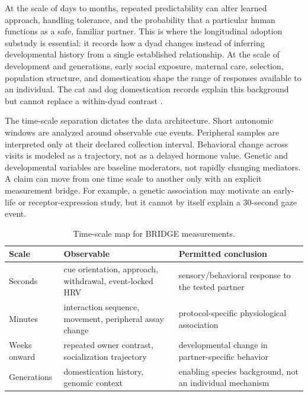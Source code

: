\documentclass[conference]{IEEEtran}
\begin{document}
At the scale of days to months, repeated predictability can alter learned approach, handling tolerance, and the probability that a particular human functions as a safe, familiar partner. This is where the longitudinal adoption substudy is essential: it records how a dyad changes instead of inferring developmental history from a single established relationship. At the scale of development and generations, early social exposure, maternal care, selection, population structure, and domestication shape the range of responses available to an individual. The cat and dog domestication records explain this background but cannot replace a within-dyad contrast \cite{axelsson2013,driscoll2007,ottoni2017}.

The time-scale separation dictates the data architecture. Short autonomic windows are analyzed around observable cue events. Peripheral samples are interpreted only at their declared collection interval. Behavioral change across visits is modeled as a trajectory, not as a delayed hormone value. Genetic and developmental variables are baseline moderators, not rapidly changing mediators. A claim can move from one time scale to another only with an explicit measurement bridge. For example, a genetic association may motivate an early-life or receptor-expression study, but it cannot by itself explain a 30-second gaze event.

\begin{table}[t]
\caption{Time-scale map for BRIDGE measurements.}
\label{tab:timescales}
\centering
\footnotesize
\begin{tabular}{p{}p{}p{}}
\toprule
\textbf{Scale} & \textbf{Observable} & \textbf{Permitted conclusion} \\
\midrule
Seconds & cue orientation, approach, withdrawal, event-locked HRV & sensory/behavioral response to the tested partner \\
Minutes & interaction sequence, movement, peripheral assay change & protocol-specific physiological association \\
Weeks onward & repeated owner contrast, socialization trajectory & developmental change in partner-specific behavior \\
Generations & domestication history, genomic context & enabling species background, not an individual mechanism \\
\bottomrule
\end{tabular}
\end{table}
\end{document}

